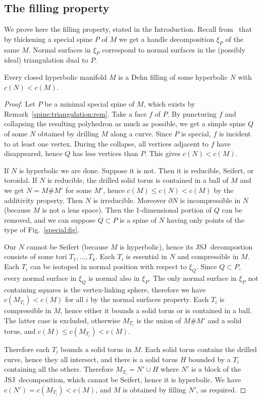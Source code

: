 \documentclass[10pt]{article}      %
\newcommand{\JSJ}{{\rm JSJ}}
\begin{document}
\subsection{The filling property} \label{properties:subsection}
We prove here the filling property, stated in the Introduction. 
Recall from~\cite{Mat90, Mat:book} 
that by thickening a special spine $P$ of $M$ we get
a handle decomposition $\xi_P$ of the same $M$. 
Normal surfaces in $\xi_P$ correspond to normal 
surfaces in the (possibly ideal) triangulation dual to $P$.

\begin{theorem} \label{filling:teo}
Every closed hyperbolic manifold $M$ is a Dehn filling of some hyperbolic $N$ with
$c(N)<c(M)$.
\end{theorem}
\begin{proof}
Let $P$ be a minimal special spine of $M$, which exists by Remark~\ref{spine:triangulation:rem}.
Take a face $f$ of $P$. By puncturing $f$ and collapsing the resulting polyhedron
as much as possible, we get a simple spine $Q$ of some $N$ obtained by drilling $M$
along a curve. Since $P$ is special, $f$ is incident to at least one vertex.
During the collapse, 
all vertices adjacent to $f$ have disappeared, hence $Q$ has less vertices than $P$.
This gives $c(N)<c(M)$. 

If $N$ is hyperbolic we are done. Suppose it is not. Then it is 
reducible, Seifert, or toroidal.
If $N$ is reducible, the drilled
solid torus is contained in a ball of $M$ and we get $N=M\# M'$
for some $M'$, hence $c(M)\leqslant c(N)<c(M)$ by the additivity property.
Then $N$ is irreducible.
Moreover $\partial N$ is incompressible
in $N$ (because $M$ is not a lens space). 
Then the 1-dimensional portion of $Q$ can be removed, and we can suppose $Q\subset P$
is a spine of $N$ having only points of the type of Fig.~\ref{special:fig}.

Our $N$ cannot be Seifert (because $M$ is hyperbolic), hence its \JSJ\ decompostion
consists of some tori $T_1,\ldots, T_k$. Each $T_i$ is essential in $N$
and compressible in $M$. Each $T_i$ can be isotoped in normal position with respect
to $\xi_Q$. Since $Q\subset P$, every normal surface in $\xi_Q$ is normal
also in $\xi_P$. The only normal surface in $\xi_P$ not containing squares is the
vertex-linking sphere,
therefore we have $c(M_{T_i})< c(M)$ for all $i$ by the normal surfaces property.
Each $T_i$ is compressible in $M$, hence either it 
bounds a solid torus or is contained in a ball. The latter case is excluded, otherwise
$M_{T_i}$ is the union of $M\# M'$ and a solid torus, and $c(M)\leqslant c(M_{T_i})<c(M)$.

Therefore each $T_i$ bounds a solid torus in $M$. Each solid torus contains the
drilled curve, hence they all intersect, and there is a solid torus $H$ bounded by a $T_i$ 
containing all the others. Therefore $M_{T_i} = N' \cup H$ where
$N'$ is a block of the \JSJ\ decomposition, 
which cannot be Seifert, hence it is hyperbolic. We have $c(N')=c(M_{T_i})<c(M)$, 
and $M$ is obtained by filling $N'$, as required.
\end{proof}
\end{document}
